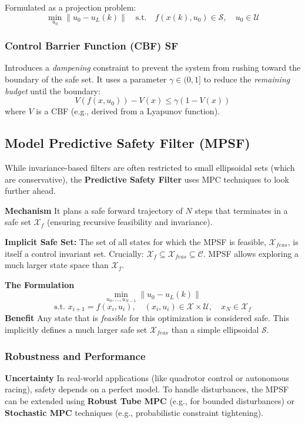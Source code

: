 Formulated as a projection problem:
\[\min_{u_0} \|u_0 - u_L(k)\| \quad \text{s.t.} \quad f(x(k), u_0)
\in \mathcal{S}, \quad u_0 \in \mathcal{U}\]

\subsubsection{Control Barrier Function (CBF) SF}

Introduces a \textit{dampening} constraint to prevent
the system from rushing toward the boundary of the safe set.
It uses a parameter $\gamma \in (0,1]$ to reduce the
\textit{remaining budget} until the boundary:
\[V(f(x, u_0)) - V(x) \le \gamma(1 - V(x))\]
where $V$ is a CBF (e.g., derived from a Lyapunov function).

\subsection{Model Predictive Safety Filter (MPSF)}

While invariance-based filters are often restricted to small
ellipsoidal sets (which are conservative),
the \textbf{Predictive Safety Filter} uses MPC techniques to look further ahead.

\textbf{Mechanism}
It plans a safe forward trajectory of $N$ steps
that terminates in a safe set $\mathcal{X}_f$
(ensuring recursive feasibility and invariance).

\textbf{Implicit Safe Set:} The set of all states for which the MPSF
is feasible, $\mathcal{X}_{feas}$, is itself a control invariant set.
Crucially: $\mathcal{X}_f \subseteq \mathcal{X}_{feas} \subseteq
\mathcal{C}$. MPSF allows exploring a much larger state space than
$\mathcal{X}_f$.

\textbf{The Formulation}
\[\min_{u_0, \dots, u_{N-1}} \|u_0 - u_L(k)\|\]
\[\text{s.t. } x_{i+1} = f(x_i, u_i), \quad (x_i, u_i) \in
\mathcal{X} \times \mathcal{U}, \quad x_N \in \mathcal{X}_f\]
\textbf{Benefit}
Any state that is \textit{feasible} for this optimization
is considered safe.
This implicitly defines a much larger safe set
$\mathcal{X}_{feas}$ than a simple ellipsoidal $\mathcal{S}$.

\subsubsection{Robustness and Performance}

\textbf{Uncertainty}
In real-world applications
(like quadrotor control or autonomous racing),
safety depends on a perfect model.
To handle disturbances, the MPSF can be extended using
\textbf{Robust Tube MPC} (e.g., for bounded disturbances) or
\textbf{Stochastic MPC} techniques
(e.g., probabilistic constraint tightening).

